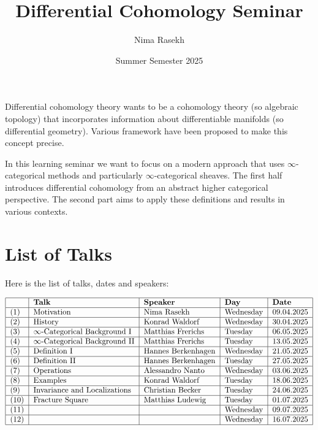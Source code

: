 \documentclass[10pt]{amsart}
\title{Differential Cohomology Seminar}
\date{Summer Semester 2025}
\author{Nima Rasekh}
\begin{document}
\maketitle


Differential cohomology theory wants to be a cohomology theory (so algebraic topology) that incorporates information about differentiable manifolds (so differential geometry). Various framework have been proposed to make this concept precise.

In this learning seminar we want to focus on a modern approach that uses $\infty$-categorical methods and particularly $\infty$-categorical sheaves. The first half introduces differential cohomology from an abstract higher categorical perspective. The second part aims to apply these definitions and results in various contexts.

\section{List of Talks}
Here is the list of talks, dates and speakers:

\[
	\begin{tabular}{|l|l|l|l|l|}
		\hline 
		& \textbf{Talk} & \textbf{Speaker} & \textbf{Day} & \textbf{Date} \\ \hline 
		(1) & Motivation & Nima Rasekh & Wednesday & 09.04.2025 \\ \hline 
		(2) & History & Konrad Waldorf & Wednesday & 30.04.2025 \\ \hline
		(3) & $\infty$-Categorical Background I &	Matthias Frerichs  & Tuesday & 06.05.2025 \\ \hline
		(4) & $\infty$-Categorical Background II &	Matthias Frerichs  & Tuesday & 13.05.2025 \\ \hline
		(5) & Definition I & 	Hannes Berkenhagen & Wednesday & 21.05.2025 \\ \hline
		(6) & Definition II & 	Hannes Berkenhagen & Tuesday & 27.05.2025 \\ \hline 
		(7) & Operations & Alessandro Nanto & Wednesday & 03.06.2025 \\ \hline
		(8) & Examples & Konrad Waldorf & Tuesday & 18.06.2025 \\ \hline
		(9) & Invariance and Localizations & Christian Becker & Tuesday & 24.06.2025 \\ \hline 
		(10) & Fracture Square & Matthias Ludewig & Tuesday & 01.07.2025 \\ \hline
		(11) & & & Wednesday & 09.07.2025 \\ \hline
		(12) & & & Wednesday &  16.07.2025 \\ \hline
	\end{tabular}
\]
\end{document}
